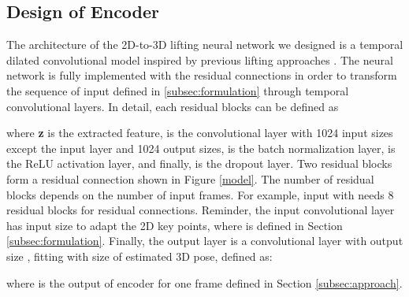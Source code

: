 \documentclass[runningheads]{llncs}
\begin{document}
\subsection{Design of Encoder}
The architecture of the 2D-to-3D lifting neural network we designed is a temporal dilated convolutional model inspired by previous lifting approaches \cite{MartinezHRL17,temporal_convolutions_and_semi_supervised}. The neural network is fully implemented with the residual connections \cite{ResNet_2016} in order to transform the sequence of input  defined in \ref{subsec:formulation} through temporal convolutional layers. 
In detail, each residual blocks can be defined as  

where \textbf{z} is the extracted feature,  is the convolutional layer with 1024 input sizes except the input layer and 1024 output sizes,  is the batch normalization layer,  is the ReLU activation layer, and finally,  is the dropout layer. Two residual blocks form a residual connection shown in Figure \ref{model}. The number of residual blocks depends on the number of input frames. For example, input  with  needs 8 residual blocks for residual connections. Reminder, the input convolutional layer has  input size to adapt the 2D key points, where  is defined in Section \ref{subsec:formulation}. Finally, the output layer is a convolutional layer with output size , fitting with size of estimated 3D pose, defined as:

where  is the output of encoder for one frame defined in Section \ref{subsec:approach}. 
\end{document}
